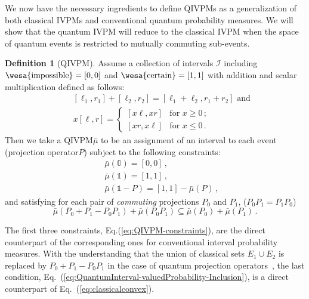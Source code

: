 \documentclass[english,reprint, aps, prl,superscriptaddress, showpacs,
showkeys, longbibliography, amsmath, amssymb]{revtex4-1}
\theoremstyle{plain}
\theoremstyle{definition}
\newtheorem{definition}[thm]{Definition}
\newcommand{\imposs}{{\text{\wesa{impossible}}}}
\newcommand{\necess}{{\text{\wesa{certain}}}}
\newcommand{\nb}{\nolinebreak[1] }
\begin{document}
We now have the necessary ingredients to define QIVPMs as a
generalization of both classical IVPMs and conventional quantum
probability measures. We will show that the quantum IVPM will reduce to
the classical IVPM when the space of quantum events is restricted to
mutually commuting sub-events.

\begin{definition}[QIVPM]
  Assume a collection of intervals $\mathscr{I}$ including
  $\imposs=[0,0]$ and $\necess=[1,1]$ with addition and scalar
  multiplication defined as follows:
  \begin{subequations}\label{eq:interval-operations}
  \begin{eqnarray}
   &  & [\ell_{1},r_{1}]+[\ell_{2},r_{2}]=[\ell_{1}+\ell_{2},r_{1}+r_{2}]\textrm{ and}\\
   &  & x[\ell,r]=\begin{cases}
  [x\ell,xr] & \textrm{for }x\ge0\,;\\{}
  [xr,x\ell] & \textrm{for }x\le0\,.
  \end{cases}
  \end{eqnarray}
  \end{subequations}
  Then we take a QIVPM\nb$\bar{\mu}$ to be an assignment of an interval to each
  event (projection operator\nb$P$) subject to the following constraints:
  \begin{subequations}\label{eq:QIVPM-constraints}
  \begin{eqnarray}
   &  & \bar{\mu}(\mathbb{0})=\left[0,0\right]\,,\\
   &  & \bar{\mu}(\mathbb{1})=\left[1,1\right]\,,\\
   &  & \bar{\mu}\left(\mathbb{1}-P\right)=\left[1,1\right]-\bar{\mu}\left(P\right)\,,
  \end{eqnarray}
  \end{subequations}
  and satisfying for each pair of \emph{commuting} projections $P_0$ and $P_1$,
  ($P_0P_1=P_1P_0$)
\begin{equation}
\bar{\mu}\left(P_{0}+P_{1}-P_{0}P_{1}\right)+\bar{\mu}\left(P_{0}P_{1}\right)\subseteq\bar{\mu}\left(P_{0}\right)+\bar{\mu}\left(P_{1}\right)\,.
\label{eq:QuantumInterval-valuedProbability-Inclusion}
\end{equation}
\end{definition}
The first three constraints, Eq.\nb(\ref{eq:QIVPM-constraints}), are the direct
counterpart of the corresponding ones for conventional interval probability
measures.
With the understanding that the union of classical sets $E_1\cup E_2$ is replaced
by $P_0+P_1-P_0P_1$ in the case of quantum projection
operators~\cite{Griffiths2003}, the last condition, Eq.~(\ref{eq:QuantumInterval-valuedProbability-Inclusion}), is
a direct counterpart of Eq.~(\ref{eq:classicalconvex}).
\end{document}
